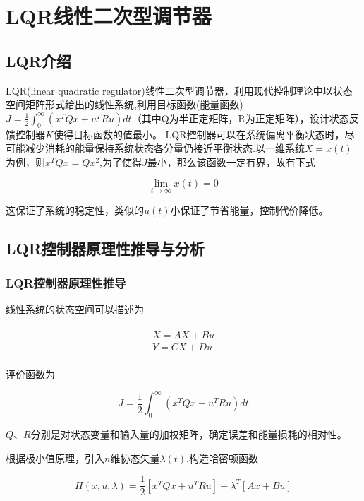 \chapter{LQR线性二次型调节器}

\section{LQR介绍}

LQR(linear quadratic regulator)线性二次型调节器，利用现代控制理论中以状态空间矩阵形式给出的线性系统,利用目标函数(能量函数)$J=\frac{1}{2}\int_0^\infty(x^TQx+u^TRu)dt$（其中Q为半正定矩阵，R为正定矩阵），设计状态反馈控制器$K$使得目标函数的值最小。
LQR控制器可以在系统偏离平衡状态时，尽可能减少消耗的能量保持系统状态各分量仍接近平衡状态.以一维系统$X=x(t)$为例，则$x^TQx=Qx^2$,为了使得$J$最小，那么该函数一定有界，故有下式

\begin{equation}
\lim_{t \rightarrow \infty}x(t)=0
\end{equation}

这保证了系统的稳定性，类似的$u(t)$小保证了节省能量，控制代价降低。

\section{LQR控制器原理性推导与分析}
\subsection{LQR控制器原理性推导}
线性系统的状态空间可以描述为
	
\begin{equation}
\begin{aligned}
\dot X=AX+Bu\\
Y=CX+Du\\
\end{aligned}
\end{equation}

评价函数为

\begin{equation}
J=\frac{1}{2}\int_0^\infty(x^TQx+u^TRu)dt
\end{equation}

$Q、R$分别是对状态变量和输入量的加权矩阵，确定误差和能量损耗的相对性。

根据极小值原理，引入$n$维协态矢量$\lambda(t)$,构造哈密顿函数

\begin{equation}
H(x,u,\lambda)=\frac{1}{2}[x^TQx+u^TRu]+\lambda^T[Ax+Bu]
\end{equation}

